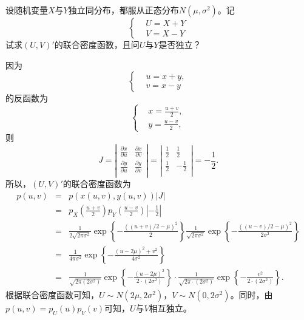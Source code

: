 \begin{example}\label{ex:lect9_3}
    设随机变量$X$与$Y$独立同分布，都服从正态分布$N(\mu,\sigma^2)$。记
    $$
    \left\{\begin{aligned}
        & U = X+Y\\
        & V = X-Y
    \end{aligned}
    \right.
    $$
    试求$(U,V)'$的联合密度函数，且问$U$与$Y$是否独立？
\end{example}
\begin{solution}
因为
$$
 \left\{\begin{aligned}
        & u = x + y,\\
        & v = x - y
    \end{aligned}
    \right.
$$
的反函数为
$$
 \left\{\begin{aligned}
        & x = \frac{u+v}{2},\\
        & y =  \frac{u-v}{2},
    \end{aligned}
    \right.
$$
则
$$
J = \left|\begin{matrix}
    \frac{\partial x}{\partial u} &  \frac{\partial x}{\partial v}\\
    \frac{\partial y}{\partial u} &  \frac{\partial y}{\partial v}\\
\end{matrix}
\right|=
\left|\begin{matrix}
    \frac{1}{2} &  \frac{1}{2}\\
    \frac{1}{2} &  -\frac{1}{2}\\
\end{matrix}
\right| = -\frac{1}{2}.
$$
所以，$(U,V)'$的联合密度函数为
\begin{eqnarray*}
    p(u,v) &=& p(x(u,v),y(u,v)) |J| \\
    &=& p_X\left(\frac{u+v}{2}\right)p_Y\left(\frac{u-v}{2}\right)\left|-\frac{1}{2}\right|\\
    &=& \frac{1}{2\sqrt{2\pi\sigma^2}} \exp\left\{-\frac{((u+v)/2 - \mu)^2}{2}\right\} \frac{1}{\sqrt{2\pi\sigma^2}} \exp\left\{
    -\frac{((u-v)/2-\mu)^2}{2\sigma^2}
    \right\}\\
    &=& \frac{1}{4\pi \sigma^2} \exp\left\{
   -\frac{(u-2\mu)^2 + v^2}{4\sigma^2} \right\}\\
   &=& \frac{1}{\sqrt{2\pi (2\sigma^2)}} \exp\left\{-\frac{(u-2\mu)^2}{2 \cdot (2\sigma^2)}\right\}\cdot \frac{1}{\sqrt{2\pi \cdot (2\sigma^2)}} \exp\left\{-\frac{v^2}{2 \cdot (2\sigma^2)}\right\}.
\end{eqnarray*}
根据联合密度函数可知，$U\sim N(2\mu,2\sigma^2)$，$V\sim N(0,2\sigma^2)$。同时，由$p(u,v) = p_U(u)p_V(v)$可知，$U$与$V$相互独立。
\end{solution}
